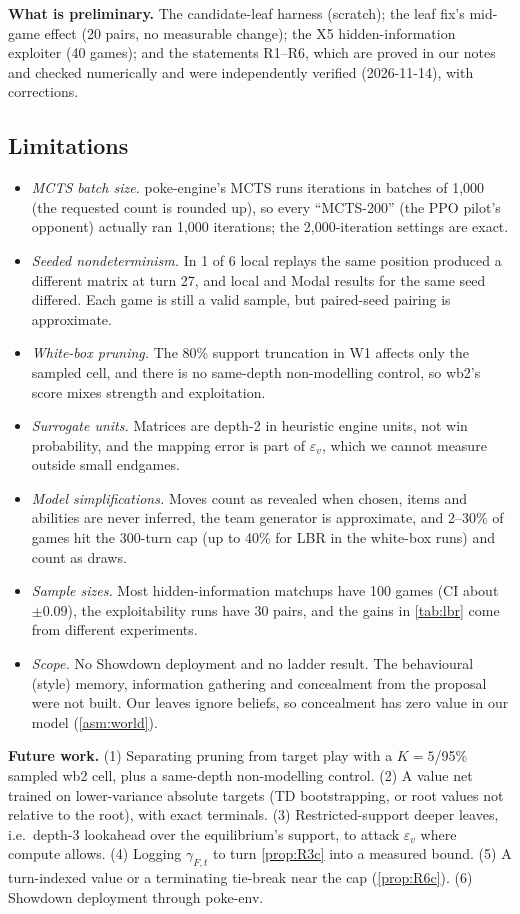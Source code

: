 \documentclass[10pt]{article}
\theoremstyle{plain}
\theoremstyle{definition}
\theoremstyle{remark}
\newcommand{\epsv}{\varepsilon_v}
\begin{document}
\textbf{What is preliminary.} The candidate-leaf harness (scratch); the leaf fix's mid-game effect (20 pairs, no measurable change); the X5 hidden-information exploiter (40 games); and the statements R1--R6, which are proved in our notes and checked numerically and were independently verified (2026-11-14), with corrections.

\subsection*{Limitations}
\label{sec:limits}
\begin{itemize}
\item \emph{MCTS batch size.} poke-engine's MCTS runs iterations in batches of 1,000 (the requested count is rounded up), so every ``MCTS-200'' (the PPO pilot's opponent) actually ran 1,000 iterations; the 2,000-iteration settings are exact.
\item \emph{Seeded nondeterminism.} In 1 of 6 local replays the same position produced a different matrix at turn 27, and local and Modal results for the same seed differed. Each game is still a valid sample, but paired-seed pairing is approximate.
\item \emph{White-box pruning.} The 80\% support truncation in W1 affects only the sampled cell, and there is no same-depth non-modelling control, so wb2's score mixes strength and exploitation.
\item \emph{Surrogate units.} Matrices are depth-2 in heuristic engine units, not win probability, and the mapping error is part of $\epsv$, which we cannot measure outside small endgames.
\item \emph{Model simplifications.} Moves count as revealed when chosen, items and abilities are never inferred, the team generator is approximate, and 2--30\% of games hit the 300-turn cap (up to 40\% for LBR in the white-box runs) and count as draws.
\item \emph{Sample sizes.} Most hidden-information matchups have 100 games (CI about $\pm0.09$), the exploitability runs have 30 pairs, and the gains in \cref{tab:lbr} come from different experiments.
\item \emph{Scope.} No Showdown deployment and no ladder result. The behavioural (style) memory, information gathering and concealment from the proposal were not built. Our leaves ignore beliefs, so concealment has zero value in our model (\cref{asm:world}).
\end{itemize}

\textbf{Future work.}
(1) Separating pruning from target play with a $K{=}5$/95\% sampled wb2 cell, plus a same-depth non-modelling control. (2) A value net trained on lower-variance absolute targets (TD bootstrapping, or root values not relative to the root), with exact terminals. (3) Restricted-support deeper leaves, i.e.\ depth-3 lookahead over the equilibrium's support, to attack $\epsv$ where compute allows. (4) Logging $\gamma_{F,t}$ to turn \cref{prop:R3c} into a measured bound. (5) A turn-indexed value or a terminating tie-break near the cap (\cref{prop:R6c}). (6) Showdown deployment through poke-env.
\end{document}
